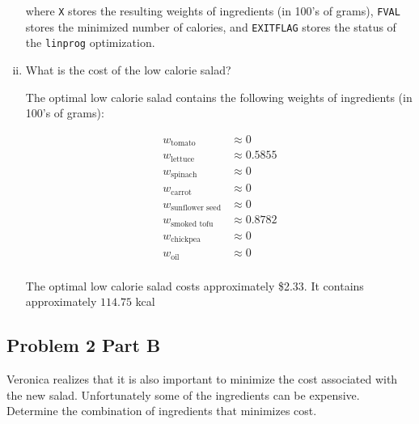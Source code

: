 \documentclass[../main.tex]{subfiles}
\begin{document}
\begin{enumerate}[i.]
	

	where \verb|X| stores the resulting weights of ingredients (in 100's of grams), \verb|FVAL| stores the minimized number of calories, and \verb|EXITFLAG| stores the status of the \verb|linprog| optimization.

	\item What is the cost of the low calorie salad?

	The optimal low calorie salad contains the following weights of ingredients (in 100's of grams):

	\begin{equation*}
		\begin{aligned}
			w_{\text{tomato}} &\approx 0 \\
			w_{\text{lettuce}} &\approx 0.5855 \\
			w_{\text{spinach}} &\approx 0 \\
			w_{\text{carrot}} &\approx 0 \\
			w_{\text{sunflower seed}} &\approx 0 \\
			w_{\text{smoked tofu}} &\approx 0.8782 \\
			w_{\text{chickpea}} &\approx 0 \\
			w_{\text{oil}} &\approx 0 \\
		\end{aligned}
	\end{equation*}

	The optimal low calorie salad costs approximately \$2.33. It contains approximately $114.75$ kcal
\end{enumerate}

\newpage

\subsection*{Problem 2 Part B}
Veronica realizes that it is also important to minimize the cost associated with the new salad. Unfortunately some of the ingredients can be expensive. Determine the combination of ingredients that minimizes cost.
\end{document}

